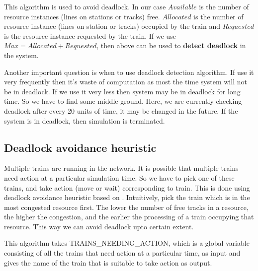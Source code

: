 This algorithm is used to avoid deadlock. 
In our case $Available$ is the number of resource instances (lines 
on stations or tracks) free. $Allocated$ is the number of resource instance (lines on station or tracks) occupied 
by the train and $Requested$ is the resource instance requested by the train. 
If we use $Max = Allocated + Requested$, then above can be used to \textbf{detect deadlock} in the system.

\vspace{0.25cm}
Another important question is when to use deadlock detection algorithm. If use it very frequently 
then it's waste of computation as most the time system will not be in deadlock. If we use it very less
then system may be in deadlock for long time. So we have to find some middle ground. Here, we are currently checking deadlock
after every 20 units of time, it may be changed in the future. If the system is in deadlock, then 
simulation is terminated.

\subsection{Deadlock avoidance heuristic}
Multiple trains are running in the network. It is possible that multiple trains need action at a particular simulation time.
So we have to pick one of these trains, and take action (move or wait) corresponding to 
train. This is done using deadlock avoidance heuristic based on \cite{ARTICLE:2}.
Intuitively, pick the train which is in the most
congested resource first. The lower the number of free tracks
in a resource, the higher the congestion, and the earlier the
processing of a train occupying that resource. This way we can avoid deadlock upto certain extent.

\vspace{0.25cm}
This algorithm takes TRAINS\_NEEDING\_ACTION, which is a global variable consisting of all the trains
that need action at a particular time, as input and gives the name of the train that is suitable to 
take action as output. 

